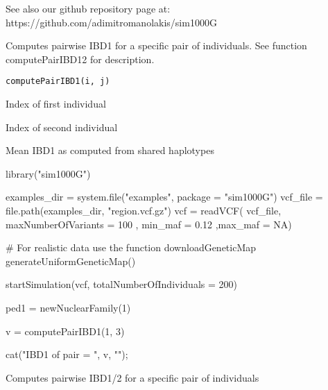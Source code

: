 \documentclass[letterpaper]{book}
\begin{document}
%
\begin{Details}\relax
See also our github repository page at:
https://github.com/adimitromanolakis/sim1000G
\end{Details}
%
\begin{Description}\relax
Computes pairwise IBD1 for a specific pair of individuals.
See function computePairIBD12 for description.
\end{Description}
%
\begin{Usage}
\begin{verbatim}
computePairIBD1(i, j)
\end{verbatim}
\end{Usage}
%
\begin{Arguments}
\begin{ldescription}
\item[\code{i}] Index of first individual

\item[\code{j}] Index of second individual
\end{ldescription}
\end{Arguments}
%
\begin{Value}
Mean IBD1 as computed from shared haplotypes
\end{Value}
%
\begin{Examples}
\begin{ExampleCode}

library("sim1000G")

examples_dir = system.file("examples", package = "sim1000G")
vcf_file = file.path(examples_dir, "region.vcf.gz")
vcf = readVCF( vcf_file, maxNumberOfVariants = 100 ,
               min_maf = 0.12 ,max_maf = NA)

# For realistic data use the function downloadGeneticMap
generateUniformGeneticMap()

startSimulation(vcf, totalNumberOfIndividuals = 200)

ped1 = newNuclearFamily(1)

v = computePairIBD1(1, 3)

cat("IBD1 of pair = ", v, "\n");

\end{ExampleCode}
\end{Examples}
%
\begin{Description}\relax
Computes pairwise IBD1/2 for a specific pair of individuals
\end{Description}
\end{document}
